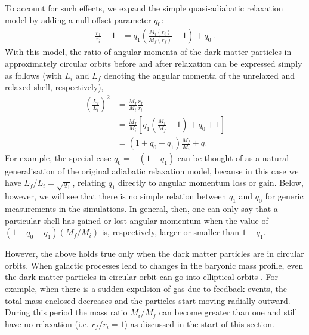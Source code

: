 To account for such effects, we expand the simple quasi-adiabatic relaxation model  by adding 
a null offset parameter $q_0$:
\begin{align}
    \label{eq:chi-linear-q0-ch:z0main}
    \frac{r_f}{r_i} - 1 &= q_1 \left( \frac{M_i(r_i)}{M_f(r_f)} - 1 \right) + q_0\,.
\end{align}
With this model, the ratio of angular momenta of the dark matter particles in approximately circular orbits before and after relaxation can be expressed simply as follows (with $L_i$ and $L_f$ denoting the angular momenta of the unrelaxed and relaxed shell, respectively),
\begin{align}
\left( \frac{L_f}{L_i} \right)^2 &= \frac{M_f}{M_i} \frac{r_f}{r_i}\\
&= \frac{M_f}{M_i} \left[ q_1 \left( \frac{M_i}{M_f} - 1 \right) + q_0 + 1 \right]\\
\label{eq:Lf-Li-ratio-ch:z0main}
&= (1 + q_0 - q_1) \frac{M_f}{M_i} + q_1
\end{align}
For example, the special case $q_0=-(1-q_1)$ can be thought of as a natural generalisation of the original adiabatic relaxation model, because in this case we have $L_f/L_i = \sqrt{q_1}$, relating $q_1$ directly to angular momentum loss or gain.
Below, however, we will see that there is no simple relation between $q_1$ and $q_0$ for generic measurements in the simulations. In general, then, one can only say that a particular shell has gained or lost angular momentum when the value of $(1 + q_0 - q_1) (M_f/M_i)$ is, respectively, larger or smaller than $1-q_1$.

However, the above holds true only when the dark matter particles are in circular orbits. When galactic processes lead to changes in the baryonic mass profile, even the dark matter particles in circular orbit can go into elliptical orbits \citep[see, e.g.][]{2005ApJ...634...70S}. For example, when there is a sudden expulsion of gas due to feedback events, the total mass enclosed decreases and the particles start moving radially outward. During this period the mass ratio $M_i/M_f$ can become greater than one and still have no relaxation (i.e. $r_f/r_i=1$) as discussed in the start of this section.

